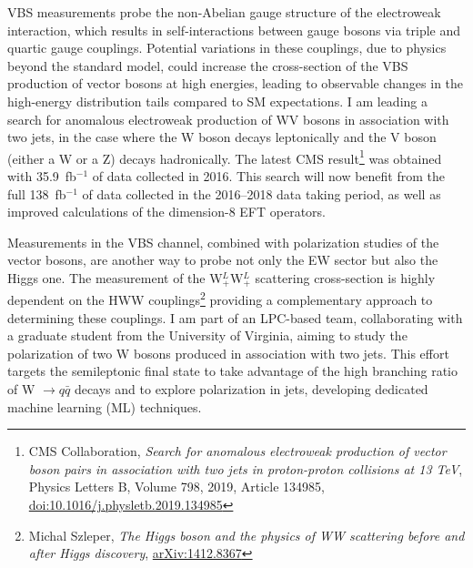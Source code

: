 {\begin{flushleft}
\vspace{\baselineskip}
VBS measurements probe the non-Abelian gauge structure of the electroweak interaction, which results in self-interactions between gauge bosons via triple and quartic gauge couplings. Potential variations in these couplings, due to physics beyond the standard model, could increase the cross-section of the VBS production of vector bosons at high energies, leading to observable changes in the high-energy distribution tails compared to SM expectations.
I am leading a search for anomalous electroweak production of WV bosons in association with two jets, in the case where the W boson decays leptonically and the V boson (either a W or a Z) decays hadronically.
The latest CMS result\footnote{CMS Collaboration, {\em Search for anomalous electroweak production of vector boson pairs in association with two jets in proton-proton collisions at 13 TeV}, Physics Letters B, Volume 798, 2019, Article 134985, \href{https://doi.org/10.1016/j.physletb.2019.134985}{doi:10.1016/j.physletb.2019.134985}} was obtained with 35.9~fb$^{-1}$ of data collected in 2016. This search will now benefit from the full 138~fb$^{-1}$ of data collected in the 2016--2018 data taking period, as well as improved calculations of the dimension-8 EFT operators.

Measurements in the VBS channel, combined with polarization studies of the vector bosons, are another way to probe not only the EW sector but also the Higgs one.
The measurement of the  W$^L_+$W$^L_+$ scattering cross-section is highly dependent on the HWW couplings\footnote{Michal Szleper, {\em The Higgs boson and the physics of WW scattering before and after Higgs discovery}, \href{https://arxiv.org/pdf/1412.8367}{arXiv:1412.8367}} providing a complementary approach to determining these couplings. 
I am part of an LPC-based team, collaborating with a graduate student from the University of Virginia, aiming to study the polarization of two W bosons produced in association with two jets. This effort targets the semileptonic final state to take advantage of the high branching ratio of W $\to q\bar{q}$ decays and to explore polarization in jets, developing dedicated machine learning (ML) techniques. 


\end{flushleft}}
